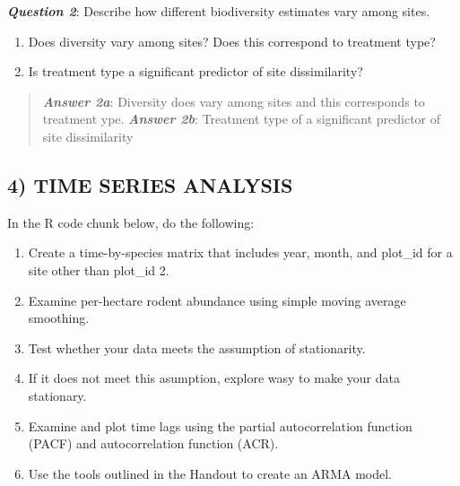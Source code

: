 \documentclass[]{article}
\providecommand{\tightlist}{%
  \setlength{\itemsep}{0pt}\setlength{\parskip}{0pt}}
\begin{document}
\textbf{\emph{Question 2}}: Describe how different biodiversity
estimates vary among sites.

\begin{enumerate}
\def\labelenumi{\alph{enumi}.}
\tightlist
\item
  Does diversity vary among sites? Does this correspond to treatment
  type?
\item
  Is treatment type a significant predictor of site dissimilarity?
\end{enumerate}

\begin{quote}
\textbf{\emph{Answer 2a}}: Diversity does vary among sites and this
corresponds to treatment ype. \textbf{\emph{Answer 2b}}: Treatment type
of a significant predictor of site dissimilarity
\end{quote}

\subsection{4) TIME SERIES ANALYSIS}\label{time-series-analysis}

In the R code chunk below, do the following:

\begin{enumerate}
\def\labelenumi{\arabic{enumi}.}
\tightlist
\item
  Create a time-by-species matrix that includes year, month, and
  plot\_id for a site other than plot\_id 2.
\item
  Examine per-hectare rodent abundance using simple moving average
  smoothing.
\item
  Test whether your data meets the assumption of stationarity.
\item
  If it does not meet this asumption, explore wasy to make your data
  stationary.
\item
  Examine and plot time lags using the partial autocorrelation function
  (PACF) and autocorrelation function (ACR).
\item
  Use the tools outlined in the Handout to create an ARMA model.
\end{enumerate}
\end{document}
